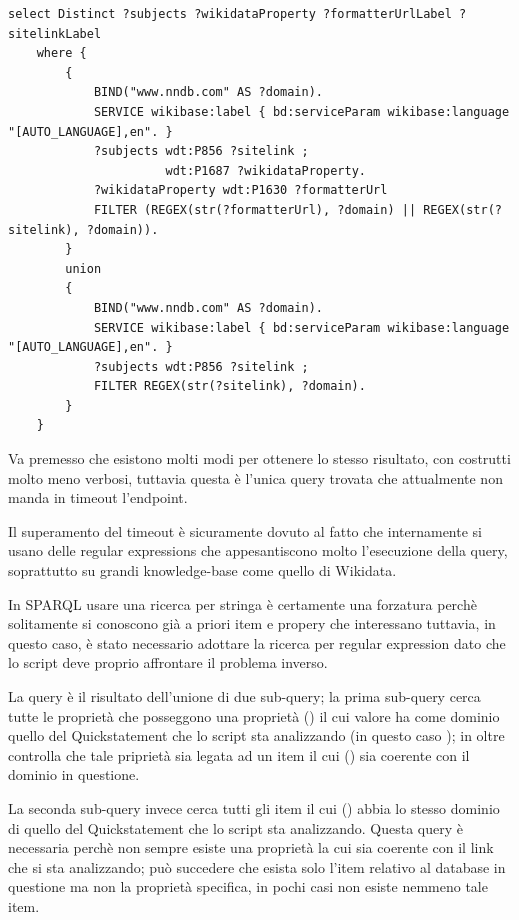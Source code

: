 \begin{lstlisting}[style=SPARQLStyle, caption=SPARQL query per cercare item e proprietà relativi al dominio \code{"www.nndb.com"}]
    select Distinct ?subjects ?wikidataProperty ?formatterUrlLabel ?sitelinkLabel
    where {
        {
            BIND("www.nndb.com" AS ?domain).
            SERVICE wikibase:label { bd:serviceParam wikibase:language "[AUTO_LANGUAGE],en". }
            ?subjects wdt:P856 ?sitelink ;
                      wdt:P1687 ?wikidataProperty.
            ?wikidataProperty wdt:P1630 ?formatterUrl
            FILTER (REGEX(str(?formatterUrl), ?domain) || REGEX(str(?sitelink), ?domain)).
        }
        union
        {
            BIND("www.nndb.com" AS ?domain).
            SERVICE wikibase:label { bd:serviceParam wikibase:language "[AUTO_LANGUAGE],en". }
            ?subjects wdt:P856 ?sitelink ;
            FILTER REGEX(str(?sitelink), ?domain).
        }
    }
\end{lstlisting}

Va premesso che esistono molti modi per ottenere lo stesso risultato, con costrutti molto meno verbosi, tuttavia questa è l'unica query trovata che attualmente non manda in timeout l'endpoint.

Il superamento del timeout è sicuramente dovuto al fatto che internamente si usano delle regular expressions che appesantiscono molto l'esecuzione della query, soprattutto su 
grandi knowledge-base come quello di Wikidata. 

In SPARQL usare una ricerca per stringa è certamente una forzatura perchè solitamente si conoscono già a priori item e propery che interessano tuttavia, in questo caso, è 
stato necessario adottare la ricerca per regular expression dato che lo script deve proprio affrontare il problema inverso.

La query è il risultato dell'unione di due sub-query; la prima sub-query cerca tutte le proprietà che posseggono una proprietà  () il cui valore ha come dominio quello del 
Quickstatement che lo script sta analizzando (in questo caso ); in oltre controlla che tale priprietà sia legata ad un item il cui  () 
sia coerente con il dominio in questione. 

La seconda sub-query invece cerca tutti gli item il cui  () abbia lo stesso dominio di quello del Quickstatement che lo script sta analizzando. 
Questa query è necessaria perchè non sempre esiste una proprietà la cui  sia coerente con il link che si sta analizzando; può succedere che esista solo l'item 
relativo al database in questione ma non la proprietà specifica, in pochi casi non esiste nemmeno tale item. 


